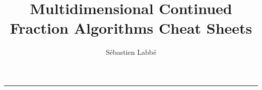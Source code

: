 \documentclass[10pt,landscape,a4paper]{article}
\begin{document}
\title{Multidimensional Continued Fraction Algorithms Cheat Sheets}
\author{Sébastien Labbé}

\maketitle
\thispagestyle{empty} %

\begin{multicols}{3}
\setlength{\premulticols}{1pt}
\setlength{\postmulticols}{1pt}
\setlength{\multicolsep}{1pt}
\setlength{\columnsep}{2pt}
\newcommand{\note}[1]{\hfill\textrm{\textcolor{gray}{#1}}}
\newcommand{\args}[1]{\textit{\textcolor{blue}{#1}}}
\newcommand{\stdout}[1]{\textcolor{Sepia}{#1}}

\tableofcontents

\raggedright
\footnotesize

\newpage


\end{multicols}

\footnotesize


\begin{multicols}{3}
\setlength{\premulticols}{1pt}
\setlength{\postmulticols}{1pt}
\setlength{\multicolsep}{1pt}
\setlength{\columnsep}{2pt}
\newcommand{\note}[1]{\hfill\textrm{\textcolor{gray}{#1}}}
\newcommand{\args}[1]{\textit{\textcolor{blue}{#1}}}
\newcommand{\stdout}[1]{\textcolor{Sepia}{#1}}
\raggedright
\footnotesize



\rule{0.3\linewidth}{0.25pt}
\scriptsize



\end{multicols}
\end{document}
